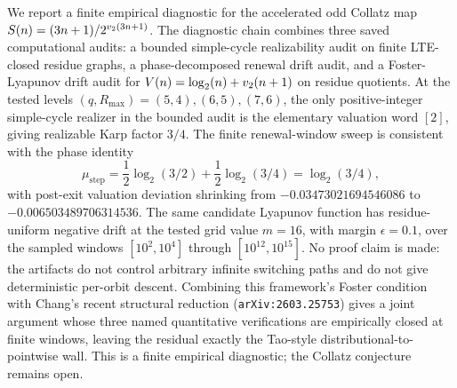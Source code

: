 We report a finite empirical diagnostic for the accelerated odd Collatz map
\(S(n)=(3n+1)/2^{v_2(3n+1)}\).  The diagnostic chain combines three saved
computational audits: a bounded simple-cycle realizability audit on finite
LTE-closed residue graphs, a phase-decomposed renewal drift audit, and a
Foster-Lyapunov drift audit for \(V(n)=\log_2(n)+v_2(n+1)\) on residue
quotients.  At the tested levels \((q,R_{\max})=(5,4),(6,5),(7,6)\), the only
positive-integer simple-cycle realizer in the bounded audit is the elementary
valuation word \([2]\), giving realizable Karp factor \(3/4\).  The finite
renewal-window sweep is consistent with the phase identity
\[
  \mu_{\mathrm{step}}
    = \frac12\log_2(3/2)+\frac12\log_2(3/4)=\log_2(3/4),
\]
with post-exit valuation deviation shrinking from
\(-0.03473021694546086\) to \(-0.006503489706314536\).  The same candidate
Lyapunov function has residue-uniform negative drift at the tested grid value
\(m=16\), with margin \(\epsilon=0.1\), over the sampled windows
\([10^2,10^4]\) through \([10^{12},10^{15}]\).  No proof claim is made:
the artifacts do not control arbitrary infinite switching paths and do not
give deterministic per-orbit descent.  Combining this framework's Foster
condition with Chang's recent structural reduction
(\texttt{arXiv:2603.25753}) gives a joint argument whose three named
quantitative verifications are empirically closed at finite windows, leaving
the residual exactly the Tao-style distributional-to-pointwise wall.  This is a
finite empirical diagnostic; the Collatz conjecture remains open.
